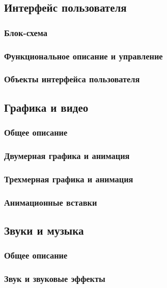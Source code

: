 \documentclass{article}
\begin{document}
\subsection{Интерфейс пользователя}
\subsubsection{Блок-схема}


\subsubsection{Функциональное описание и управление}


\subsubsection{Объекты интерфейса пользователя}


\subsection{Графика и видео}
\subsubsection{Общее описание}


\subsubsection{Двумерная графика и анимация}


\subsubsection{Трехмерная графика и анимация}


\subsubsection{Анимационные вставки}


\subsection{Звуки и музыка}
\subsubsection{Общее описание}


\subsubsection{Звук и звуковые эффекты}
\end{document}
